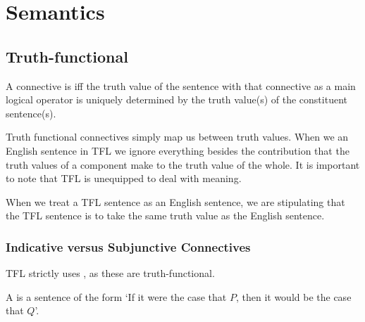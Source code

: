 %
%
%
\chapter{Semantics}
\label{Sem} %


\section{ Truth-functional}


\begin{definition}
    A connective is  iff the truth value of the sentence with that connective as a main logical operator is uniquely determined by the truth value(s) of the constituent sentence(s).
\end{definition}

\begin{remark}
    Truth functional connectives simply map us between truth values. When we  an English sentence in TFL we ignore everything besides the contribution that the truth values of a component make to the truth value of the whole. It is important to note that TFL is unequipped to deal with meaning.
\end{remark}


\begin{definition}
    When we treat a TFL sentence as  an English sentence, we are stipulating that the TFL sentence is to take the same truth value as the English sentence.
\end{definition}

\subsection{ Indicative versus Subjunctive Connectives}

\begin{definition}
    TFL strictly uses , as these are truth-functional.
\end{definition}


\begin{definition}
    A  is a sentence of the form `If it were the case that $P$, then it would be the case that $Q$'.
\end{definition}

